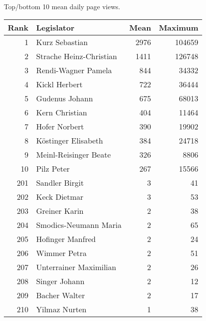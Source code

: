 \centering
\caption{Top/bottom 10 mean daily page views.\label{tab:pageviewstopaut}} 
\begingroup\scriptsize
\begin{tabular}{rlrr}
  \toprule
Rank & Legislator & Mean & Maximum \\ 
  \midrule
1 & Kurz Sebastian & 2976 & 104659 \\ 
  2 & Strache Heinz-Christian & 1411 & 126748 \\ 
  3 & Rendi-Wagner Pamela & 844 & 34332 \\ 
  4 & Kickl Herbert & 722 & 36444 \\ 
  5 & Gudenus Johann & 675 & 68013 \\ 
   \midrule
6 & Kern Christian & 404 & 11464 \\ 
  7 & Hofer Norbert & 390 & 19902 \\ 
  8 & Köstinger Elisabeth & 384 & 24718 \\ 
  9 & Meinl-Reisinger Beate & 326 & 8806 \\ 
  10 & Pilz Peter & 267 & 15566 \\ 
   \midrule
201 & Sandler Birgit & 3 & 41 \\ 
  202 & Keck Dietmar & 3 & 53 \\ 
  203 & Greiner Karin & 2 & 38 \\ 
  204 & Smodics-Neumann Maria & 2 & 65 \\ 
  205 & Hofinger Manfred & 2 & 24 \\ 
   \midrule
206 & Wimmer Petra & 2 & 51 \\ 
  207 & Unterrainer Maximilian & 2 & 26 \\ 
  208 & Singer Johann & 2 & 12 \\ 
  209 & Bacher Walter & 2 & 17 \\ 
  210 & Yilmaz Nurten & 1 & 38 \\ 
   \bottomrule
\end{tabular}
\endgroup
